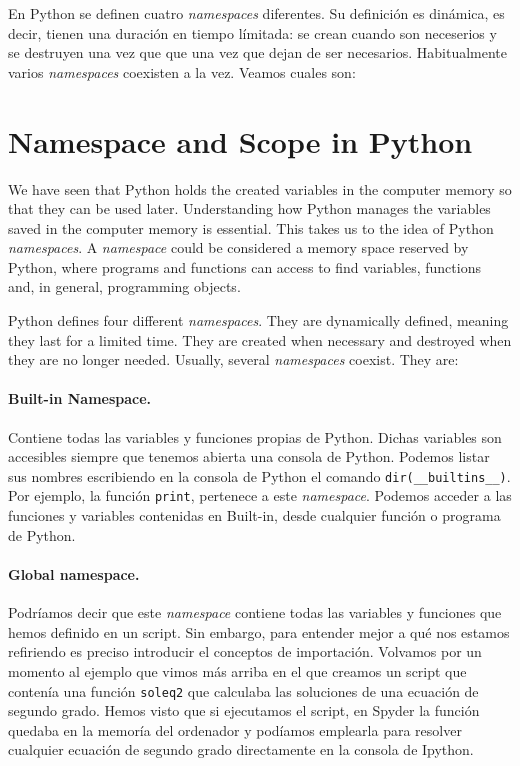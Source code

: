 \begin{paracol}{2}
En Python se definen cuatro \emph{namespaces} diferentes. Su definición es dinámica, es decir, tienen una duración en tiempo límitada: se crean cuando son neceserios y se destruyen una vez que que una vez que dejan de ser necesarios. Habitualmente varios \emph{namespaces} coexisten a la vez. Veamos cuales son:

\switchcolumn
\section{Namespace and Scope in Python}
We have seen that Python holds the created variables in the computer memory so that they can be used later. Understanding how Python manages the variables saved in the computer memory is essential. This takes us to the idea of Python \emph{namespaces}.
A \emph{namespace} could be considered a memory space reserved by Python, where programs and functions can access to find variables, functions and, in general, programming objects.

Python defines four different \emph{namespaces}. They are dynamically defined, meaning they last for a limited time. They are created when necessary and destroyed when they are no longer needed. Usually, several \emph{namespaces} coexist. They are:

\switchcolumn
\paragraph{Built-in Namespace.} Contiene todas las variables y funciones propias de Python. Dichas variables son accesibles siempre que tenemos abierta una consola de Python. Podemos listar sus nombres escribiendo en la consola de Python el comando \texttt{dir(__builtins__)}. Por ejemplo, la función \texttt{print}, pertenece a este \emph{namespace}. Podemos acceder a las funciones y variables contenidas en Built-in, desde cualquier función o programa de Python.

\paragraph{Global namespace.} Podríamos decir que este \emph{namespace} contiene todas las variables y funciones que hemos definido en un script. Sin embargo, para entender mejor a qué nos estamos refiriendo es preciso introducir el conceptos de importación. Volvamos por un momento al ejemplo que vimos más arriba en el que creamos un script que contenía una función \texttt{soleq2} que calculaba las soluciones de una ecuación de segundo grado. Hemos visto que si ejecutamos el script, en Spyder la función quedaba en la memoría del ordenador y podíamos emplearla para resolver cualquier ecuación de segundo grado directamente en la consola de Ipython.


\end{paracol}
